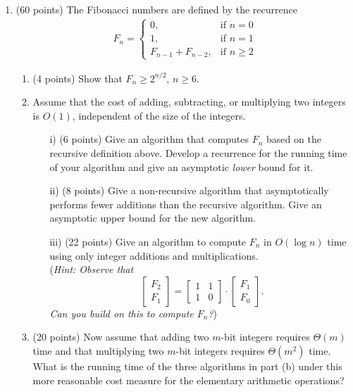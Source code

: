 \documentclass[11pt]{article}
\renewcommand\arraystretch{2.4}
\begin{document}
\begin{enumerate}
%
\bigskip
%
\renewcommand\arraystretch{1.0}
%
\item (60 points) The Fibonacci numbers are defined by the recurrence 
\begin{eqnarray*}
F_n =
\left\{ \begin{array}{lr}
0, & \mbox{if $n=0$} \\
1, & \mbox{if $n=1$} \\
F_{n-1} + F_{n-2}, & \mbox{if $n\geq 2$} 
\end{array}
\right. 
\end{eqnarray*}
\begin{enumerate}
\item (4 points) Show that $F_n \geq 2^{n/2}$, $n \geq 6$. 
\item Assume that the cost of adding, subtracting, or multiplying
two integers is $O(1)$, independent of the size of the integers.  
\begin{itemize}
\item[i)] (6 points) Give  an algorithm that computes $F_n$ based on the 
recursive definition above. Develop a recurrence for the running time of 
your algorithm and give an asymptotic {\em lower} bound for it.
\item[ii)] (8 points) Give a non-recursive algorithm that asymptotically 
performs fewer additions than the recursive algorithm. Give an asymptotic 
upper bound for the new algorithm. 
\item[iii)] (22 points) Give an algorithm to compute $F_n$ in $O(\log{n})$ time 
using only integer additions and multiplications. \\
({\em Hint: Observe that 
$$
\begin{bmatrix}  F_{2}   \\  F_1 \end{bmatrix} =  
\begin{bmatrix}  1 & 1  \\  1 & 0  \end{bmatrix} \cdot \begin{bmatrix}  F_{1}   \\  F_0 \end{bmatrix}.
$$
Can you build on this  to compute $F_n$?})
\end{itemize}
\item (20 points) Now assume that adding two $m$-bit integers requires 
$\Theta(m)$ time and that multiplying two $m$-bit integers requires 
$\Theta( m^2 )$ time. What is the running time of the three
algorithms in part (b) under this more reasonable cost measure 
for the elementary arithmetic operations?
\end{enumerate} 
\end{enumerate}
\end{document}
